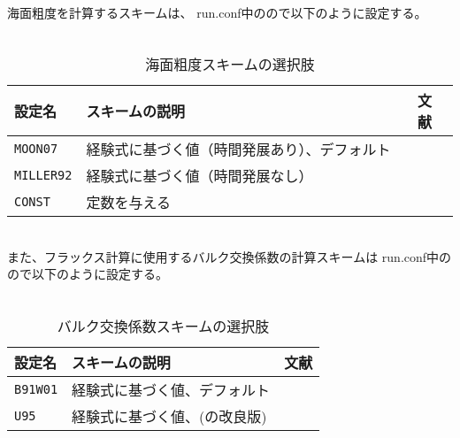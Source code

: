 海面粗度を計算するスキームは、
run.conf中のので以下のように設定する。\\

\\

\begin{table}[h]
\begin{center}
  \caption{海面粗度スキームの選択肢}
  \label{tab:nml_roughness}
  \begin{tabularx}{150mm}{llX} \hline
    \rowcolor[gray]{0.9}  設定名 & スキームの説明 & 文献 \\ \hline
      \verb|MOON07|   & 経験式に基づく値（時間発展あり）、デフォルト　& \citet{moon_2007} \\
      \verb|MILLER92| & 経験式に基づく値（時間発展なし）　　　　　　　& \citet{miller_1992} \\
      \verb|CONST|    & 定数を与える & \\
    \hline
  \end{tabularx}
\end{center}
\end{table}

~\\
また、フラックス計算に使用するバルク交換係数の計算スキームは
run.conf中のので以下のように設定する。\\

\\

\begin{table}[h]
\begin{center}
  \caption{バルク交換係数スキームの選択肢}
  \label{tab:nml_bulk}
  \begin{tabularx}{150mm}{llX} \hline
    \rowcolor[gray]{0.9}  設定名 & スキームの説明 & 文献 \\ \hline
      \verb|B91W01| & 経験式に基づく値、デフォルト & \citet{beljaars_1991,wilson_2001} \\
      \verb|U95|    & 経験式に基づく値、(\citet{louis_1979}の改良版) & \citet{uno_1995} \\
    \hline
  \end{tabularx}
\end{center}
\end{table}



